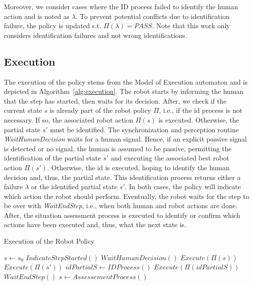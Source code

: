 Moreover, we consider cases where the ID process failed to identify the human action and is noted as $\lambda$. To prevent potential conflicts due to identification failure, the policy is updated s.t. $\Pi(\lambda) = PASS$.
Note that this work only considers identification failures and not wrong identifications. 


    \subsection*{Execution}

The execution of the policy stems from the Model of Execution automaton and is depicted in Algorithm~\ref{alg:execution}. The robot starts by informing the human that the step has started, then waits for its decision. After, we check if the current state $s$ is already part of the robot policy $\Pi$, i.e., if the \acrshort{id} process is not necessary. If so, the associated robot action $\Pi(s)$ is executed. Otherwise, the partial state $s'$ must be identified. The synchronization and perception routine \textit{WaitHumanDecision} waits for a human signal. Hence, if an explicit passive signal is detected or no signal, the human is assumed to be passive, permitting the identification of the partial state $s'$ and executing the associated best robot action $\Pi(s')$. Otherwise, the \acrshort{id} is executed, hoping to identify the human decision and, thus, the partial state. This identification process returns either a failure $\lambda$ or the identified partial state $s'$. In both cases, the policy will indicate which action the robot should perform. 
Eventually, the robot waits for the step to be over with \textit{WaitEndStep}, i.e., when both human and robot actions are done. After, the situation assessment process is executed to identify or confirm which actions have been executed and, thus, what the next state is.

\begin{algorithm}
\caption{Execution of the Robot Policy }\label{alg:execution}
\begin{algorithmic}[1]

\State $s \gets s_0$ 
    \State $IndicateStepStarted()$ 
    \State $WaitHumanDecision()$
     
        \State $Execute(\Pi(s))$
    \Else
         
            \State $Execute(\Pi(s'))$
        \Else
            \State $idPartialS \gets IDProcess()$ 
            \State $Execute(\Pi(idPartialS))$
        \EndIf
    \EndIf
    \State $WaitEndStep()$ 
    \State $s \gets AssessementProcess()$ 
\EndWhile

\end{algorithmic}
\end{algorithm}

